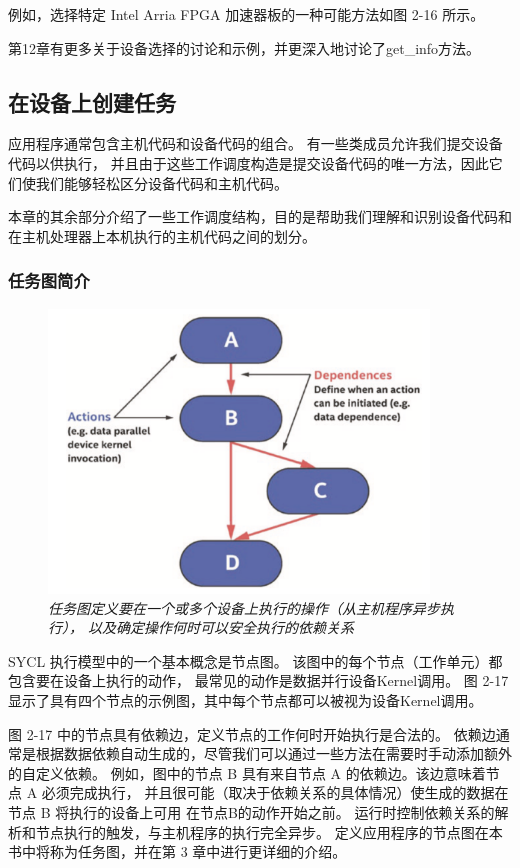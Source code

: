 例如，选择特定 Intel Arria FPGA 加速器板的一种可能方法如图 2-16 所示。

第12章有更多关于设备选择的讨论和示例，并更深入地讨论了get\_info方法。

\subsection{在设备上创建任务}
应用程序通常包含主机代码和设备代码的组合。 有一些类成员允许我们提交设备代码以供执行，
并且由于这些工作调度构造是提交设备代码的唯一方法，因此它们使我们能够轻松区分设备代码和主机代码。

本章的其余部分介绍了一些工作调度结构，目的是帮助我们理解和识别设备代码和在主机处理器上本机执行的主机代码之间的划分。

\subsubsection{任务图简介}
\begin{figure}[H]
	\centering
	\includegraphics[width=0.9\textwidth]{figs/F2.17.png}
	\caption{\textit{任务图定义要在一个或多个设备上执行的操作（从主机程序异步执行），
	以及确定操作何时可以安全执行的依赖关系}}
\end{figure}

SYCL 执行模型中的一个基本概念是节点图。 该图中的每个节点（工作单元）都包含要在设备上执行的动作，
最常见的动作是数据并行设备Kernel调用。 图 2-17 显示了具有四个节点的示例图，其中每个节点都可以被视为设备Kernel调用。

图 2-17 中的节点具有依赖边，定义节点的工作何时开始执行是合法的。 
依赖边通常是根据数据依赖自动生成的，尽管我们可以通过一些方法在需要时手动添加额外的自定义依赖。 
例如，图中的节点 B 具有来自节点 A 的依赖边。该边意味着节点 A 必须完成执行，
并且很可能（取决于依赖关系的具体情况）使生成的数据在节点 B 将执行的设备上可用 在节点B的动作开始之前。 
运行时控制依赖关系的解析和节点执行的触发，与主机程序的执行完全异步。 
定义应用程序的节点图在本书中将称为任务图，并在第 3 章中进行更详细的介绍。

